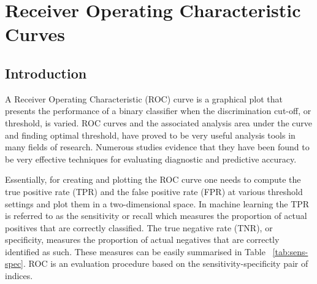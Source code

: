 \chapter{Receiver Operating Characteristic Curves}
\label{ch:roc-curves}

\section{Introduction}
\noindent A Receiver Operating Characteristic (ROC) curve is a graphical plot that presents the performance of a binary classifier when the discrimination cut-off, or threshold, is varied. ROC curves and the associated analysis area under the curve and finding optimal threshold, have proved to be very useful analysis tools in many fields of research. Numerous studies evidence that they have been found to be very effective techniques for evaluating diagnostic and predictive accuracy.

Essentially, for creating and plotting the ROC curve one needs to compute the true positive rate (TPR) and the false positive rate (FPR) at various threshold settings and plot them in a two-dimensional space. In machine learning the TPR is referred to as the sensitivity or recall which measures the proportion of actual positives that are correctly classified. The true negative rate (TNR), or specificity, measures the proportion of actual negatives that are correctly identified as such. These measures can be easily summarised in Table ~\ref{tab:sens-spec}. ROC is an evaluation procedure based on the sensitivity-specificity pair of indices.

